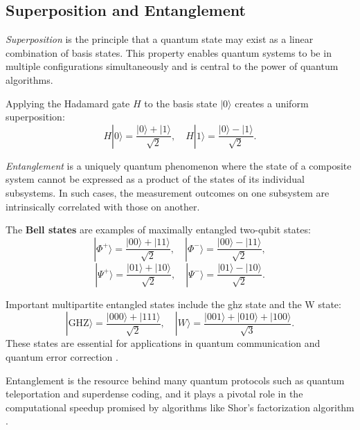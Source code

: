 
\subsection{Superposition and Entanglement}
\label{subsec:superposition}

\begin{definition}[Superposition]
\emph{Superposition} is the principle that a quantum state may exist as a linear combination of basis states. This property enables quantum systems to be in multiple configurations simultaneously and is central to the power of quantum algorithms.
\end{definition}

\begin{example}
    \label{ex:hadamard}
Applying the Hadamard gate \(H\) to the basis state \(|0\rangle\) creates a uniform superposition:
\[
H|0\rangle = \frac{|0\rangle + |1\rangle}{\sqrt{2}}, \quad H|1\rangle = \frac{|0\rangle - |1\rangle}{\sqrt{2}}.
\]
\end{example}

\begin{definition}[Entanglement]
\emph{Entanglement} is a uniquely quantum phenomenon where the state of a composite system cannot be expressed as a product of the states of its individual subsystems. In such cases, the measurement outcomes on one subsystem are intrinsically correlated with those on another.
\end{definition}

\begin{example}
The \textbf{Bell states} are examples of maximally entangled two-qubit states:
\[
|\Phi^+\rangle = \frac{|00\rangle + |11\rangle}{\sqrt{2}}, \quad
|\Phi^-\rangle = \frac{|00\rangle - |11\rangle}{\sqrt{2}},
\]
\[
|\Psi^+\rangle = \frac{|01\rangle + |10\rangle}{\sqrt{2}}, \quad
|\Psi^-\rangle = \frac{|01\rangle - |10\rangle}{\sqrt{2}}.
\]
\end{example}

\begin{example}
    Important multipartite entangled states include the \gls{ghz} state and the W state:
    \[
    |\text{GHZ}\rangle = \frac{|000\rangle + |111\rangle}{\sqrt{2}}, \quad
    |W\rangle = \frac{|001\rangle + |010\rangle + |100\rangle}{\sqrt{3}}.
    \]
    These states are essential for applications in quantum communication and quantum error correction \cite{greenberger1990bell}.
\end{example}

\begin{observation}
    Entanglement is the resource behind many quantum protocols such as quantum teleportation \cite{bennett1993teleporting} and superdense coding, and it plays a pivotal role in the computational speedup promised by algorithms like Shor's factorization algorithm \cite{shor1994algorithms}.
\end{observation}
